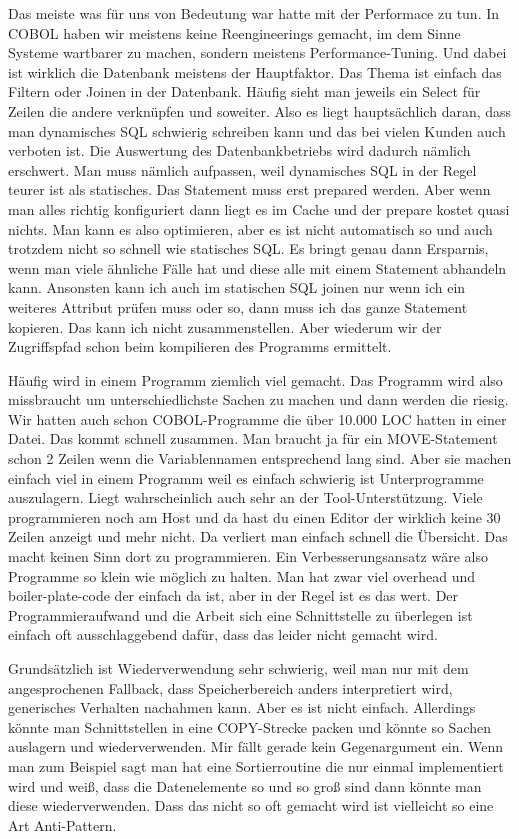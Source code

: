 {    Das meiste was für uns von Bedeutung war hatte mit der Performace zu tun. In COBOL haben wir meistens keine Reengineerings gemacht, im dem Sinne Systeme wartbarer zu machen, sondern meistens Performance-Tuning. Und dabei ist wirklich die Datenbank meistens der Hauptfaktor. Das Thema ist einfach das Filtern oder Joinen in der Datenbank. Häufig sieht man jeweils ein Select für Zeilen die andere verknüpfen und soweiter. Also es liegt hauptsächlich daran, dass man dynamisches SQL schwierig schreiben kann und das bei vielen Kunden auch verboten ist. Die Auswertung des Datenbankbetriebs wird dadurch nämlich erschwert. Man muss nämlich aufpassen, weil dynamisches SQL in der Regel teurer ist als statisches. Das Statement muss erst prepared werden. Aber wenn man alles richtig konfiguriert dann liegt es im Cache und der prepare kostet quasi nichts. Man kann es also optimieren, aber es ist nicht automatisch so und auch trotzdem nicht so schnell wie statisches SQL. Es bringt genau dann Ersparnis, wenn man viele ähnliche Fälle hat und diese alle mit einem Statement abhandeln kann. Ansonsten kann ich auch im statischen SQL joinen nur wenn ich ein weiteres Attribut prüfen muss oder so, dann muss ich das ganze Statement kopieren. Das kann ich nicht zusammenstellen. Aber wiederum wir der Zugriffspfad schon beim kompilieren des Programms ermittelt.

    Häufig wird in einem Programm ziemlich viel gemacht. Das Programm wird also missbraucht um unterschiedlichste Sachen zu machen und dann werden die riesig. Wir hatten auch schon COBOL-Programme die über 10.000 LOC hatten in einer Datei. Das kommt schnell zusammen. Man braucht ja für ein MOVE-Statement schon 2 Zeilen wenn die Variablennamen entsprechend lang sind. Aber sie machen einfach viel in einem Programm weil es einfach schwierig ist Unterprogramme auszulagern. Liegt wahrscheinlich auch sehr an der Tool-Unterstützung. Viele programmieren noch am Host und da hast du einen Editor der wirklich keine 30 Zeilen anzeigt und mehr nicht. Da verliert man einfach schnell die Übersicht. Das macht keinen Sinn dort zu programmieren. Ein Verbesserungsansatz wäre also Programme so klein wie möglich zu halten. Man hat zwar viel overhead und boiler-plate-code der einfach da ist, aber in der Regel ist es das wert. Der Programmieraufwand und die Arbeit sich eine Schnittstelle zu überlegen ist einfach oft ausschlaggebend dafür, dass das leider nicht gemacht wird. 

    Grundsätzlich ist Wiederverwendung sehr schwierig, weil man nur mit dem angesprochenen Fallback, dass Speicherbereich anders interpretiert wird, generisches Verhalten nachahmen kann. Aber es ist nicht einfach. Allerdings könnte man Schnittstellen in eine COPY-Strecke packen und könnte so Sachen auslagern und wiederverwenden. Mir fällt gerade kein Gegenargument ein. Wenn man zum Beispiel sagt man hat eine Sortierroutine die nur einmal implementiert wird und weiß, dass die Datenelemente so und so groß sind dann könnte man diese wiederverwenden. Dass das nicht so oft gemacht wird ist vielleicht so eine Art Anti-Pattern.
}